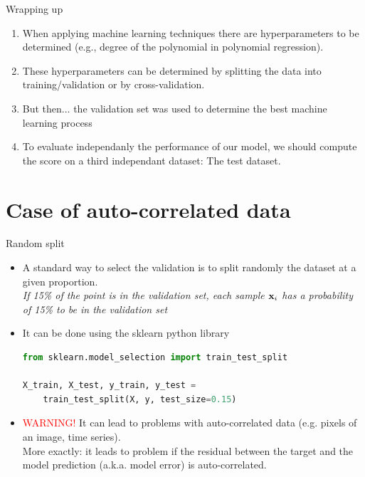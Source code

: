 \documentclass[handout, 10pt]{beamer}
\begin{document}
\begin{frame}{Wrapping up}
\begin{enumerate}[<+->]
    \item When applying machine learning techniques there are \alert{hyperparameters} to be determined (e.g., degree of the polynomial in polynomial regression).
    \item These \alert{hyperparameters}  can be determined by splitting the data into training/validation or by cross-validation.
    \item But then... the validation set was used to determine the best machine learning process
    \item To evaluate independanly the performance of our model, we should compute the score on a \alert{third independant dataset: The test dataset}.
    
\end{enumerate}
\end{frame}

\section{Case of auto-correlated data}

\begin{frame}[fragile]{Random split}

\begin{itemize}[<+->]
\item A standard way to select the validation is to split randomly the dataset at a given proportion.\\
\textit{If 15\% of the point is in the validation set, each sample ${\bf x}_i$ has a probability of 15\% to be in the validation set}
\item It can be done using the sklearn python library
\begin{lstlisting}[language=Python]
from sklearn.model_selection import train_test_split

X_train, X_test, y_train, y_test = 
    train_test_split(X, y, test_size=0.15)
\end{lstlisting}
\item {\large \textcolor{red}{WARNING!}} It can lead to problems with auto-correlated data (e.g. pixels of an image, time series).\\
\alert {More exactly}: it leads to problem if the residual between the target and the model prediction (a.k.a. model error) is auto-correlated.
\end{itemize}
\end{frame}
\end{document}
